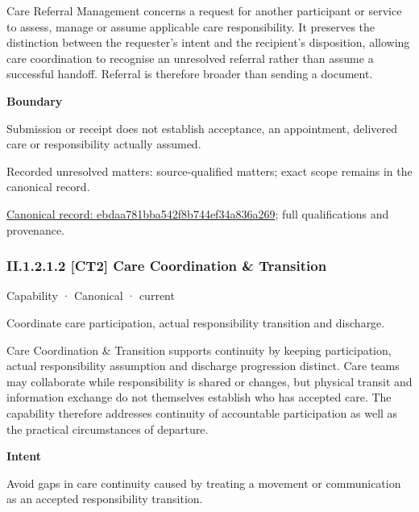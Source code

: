 Care Referral Management concerns a request for another participant or service to assess, manage or assume applicable care responsibility. It preserves the distinction between the requester's intent and the recipient's disposition, allowing care coordination to recognise an unresolved referral rather than assume a successful handoff. Referral is therefore broader than sending a document.



\textbf{Boundary}



Submission or receipt does not establish acceptance, an appointment, delivered care or responsibility actually assumed.


{\small Recorded unresolved matters: source-qualified matters; exact scope remains in the canonical record.}\par
{\footnotesize \href{../../../../continuum/strategy/capability/ebdaa781bba542f8b744ef34a836a269.md}{Canonical record: ebdaa781bba542f8b744ef34a836a269}; full qualifications and provenance.}\par
\subsubsection*{II.1.2.1.2 [CT2] Care Coordination \& Transition}
\label{navigation:II.1.2.1.2}

\label{element:174a9b93d19c44828f20360e9d543925}
{\small Capability · Canonical · current}\par

Coordinate care participation, actual responsibility transition and discharge.



Care Coordination \& Transition supports continuity by keeping participation, actual responsibility assumption and discharge progression distinct. Care teams may collaborate while responsibility is shared or changes, but physical transit and information exchange do not themselves establish who has accepted care. The capability therefore addresses continuity of accountable participation as well as the practical circumstances of departure.



\textbf{Intent}



Avoid gaps in care continuity caused by treating a movement or communication as an accepted responsibility transition.



